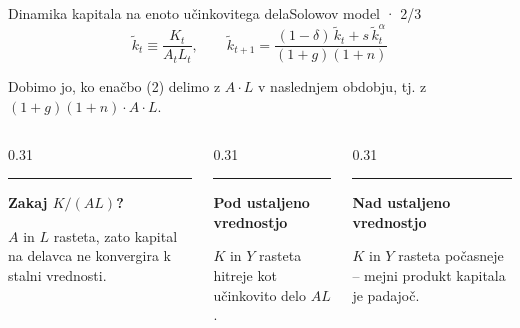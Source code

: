 \documentclass[aspectratio=169,10pt]{beamer}
\makeatletter
\newcommand{\vir}[1]{\gdef\vir@besedilo{#1}}
\gdef\vir@besedilo{}
\newcommand{\kartica}[2]{%
  {\color{accent}\rule{\linewidth}{1pt}}\par\vspace{1.5mm}%
  {\bfseries\normalsize #1}\par\vspace{1mm}%
  {\color{body}\small #2}}
\makeatother
\begin{document}
\begin{frame}{Dinamika kapitala na enoto učinkovitega dela}{Solowov model · 2/3}
\vir{Vir: Grobovšek (2026, pros. 16--21, 31 in 52--57)}
\[ \tilde k_t\equiv\frac{K_t}{A_tL_t},\qquad \tilde k_{t+1}=\frac{(1-\delta)\,\tilde k_t+s\,\tilde k_t^{\alpha}}{(1+g)(1+n)} \tag{3}\]
\begin{center}{\color{body}\small Dobimo jo, ko enačbo (2) delimo z $A\cdot L$ v naslednjem obdobju, tj. z $(1+g)(1+n)\cdot A\cdot L$.}\end{center}
\vspace{4mm}
\begin{columns}[T,onlytextwidth]
\begin{column}{0.31\textwidth}\kartica{Zakaj $K/(AL)$?}{$A$ in $L$ rasteta, zato kapital na delavca ne konvergira k stalni vrednosti.}\end{column}
\begin{column}{0.31\textwidth}\kartica{\color{accent}Pod ustaljeno vrednostjo}{$K$ in $Y$ rasteta hitreje kot učinkovito delo $AL$.}\end{column}
\begin{column}{0.31\textwidth}\kartica{\color{hl}Nad ustaljeno vrednostjo}{$K$ in $Y$ rasteta počasneje -- mejni produkt kapitala je padajoč.}\end{column}
\end{columns}
\end{frame}
\end{document}
